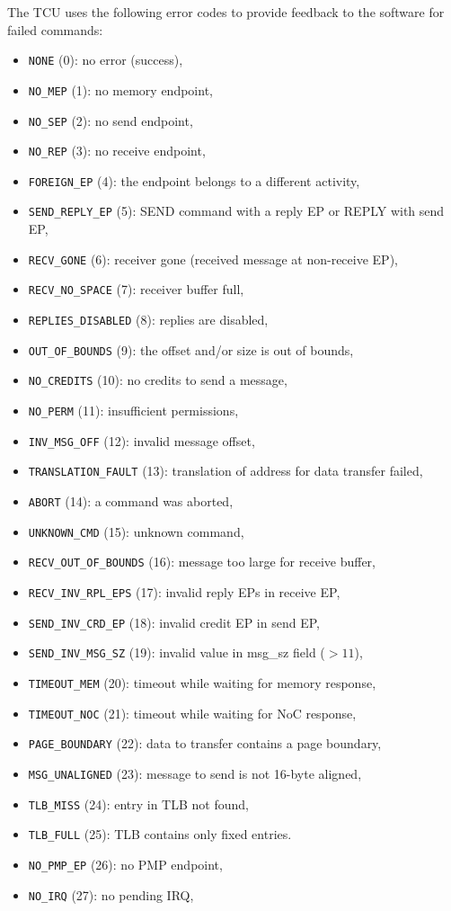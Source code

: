 The TCU uses the following error codes to provide feedback to the software for failed commands:

\begin{itemize}
  \item \texttt{NONE} (0): no error (success),
  \item \texttt{NO\_MEP} (1): no memory endpoint,
  \item \texttt{NO\_SEP} (2): no send endpoint,
  \item \texttt{NO\_REP} (3): no receive endpoint,
  \item \texttt{FOREIGN\_EP} (4): the endpoint belongs to a different activity,
  \item \texttt{SEND\_REPLY\_EP} (5): SEND command with a reply EP or REPLY with send EP,
  \item \texttt{RECV\_GONE} (6): receiver gone (received message at non-receive EP),
  \item \texttt{RECV\_NO\_SPACE} (7): receiver buffer full,
  \item \texttt{REPLIES\_DISABLED} (8): replies are disabled,
  \item \texttt{OUT\_OF\_BOUNDS} (9): the offset and/or size is out of bounds,
  \item \texttt{NO\_CREDITS} (10): no credits to send a message,
  \item \texttt{NO\_PERM} (11): insufficient permissions,
  \item \texttt{INV\_MSG\_OFF} (12): invalid message offset,
  \item \texttt{TRANSLATION\_FAULT} (13): translation of address for data transfer failed,
  \item \texttt{ABORT} (14): a command was aborted,
  \item \texttt{UNKNOWN\_CMD} (15): unknown command,
  \item \texttt{RECV\_OUT\_OF\_BOUNDS} (16): message too large for receive buffer,
  \item \texttt{RECV\_INV\_RPL\_EPS} (17): invalid reply EPs in receive EP,
  \item \texttt{SEND\_INV\_CRD\_EP} (18): invalid credit EP in send EP,
  \item \texttt{SEND\_INV\_MSG\_SZ} (19): invalid value in msg\_sz field ($> 11$),
  \item \texttt{TIMEOUT\_MEM} (20): timeout while waiting for memory response,
  \item \texttt{TIMEOUT\_NOC} (21): timeout while waiting for NoC response,
  \item \texttt{PAGE\_BOUNDARY} (22): data to transfer contains a page boundary,
  \item \texttt{MSG\_UNALIGNED} (23): message to send is not 16-byte aligned,
  \item \texttt{TLB\_MISS} (24): entry in TLB not found,
  \item \texttt{TLB\_FULL} (25): TLB contains only fixed entries.
  \item \texttt{NO\_PMP\_EP} (26): no PMP endpoint,
  \item \texttt{NO\_IRQ} (27): no pending IRQ,
\end{itemize}
